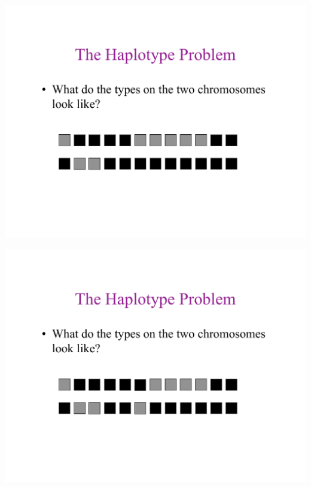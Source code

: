 \newslide{}
\mbox{}
\vspace*{\VertUp}
\enlargethispage*{1000pt}
\begin{center}
\includegraphics*[width=\textwidth]{PPT_pages/pg_0007.pdf}
\end{center}


\newslide{}
\mbox{}
\vspace*{\VertUp}
\enlargethispage*{1000pt}
\begin{center}
\includegraphics*[width=\textwidth]{PPT_pages/pg_0008.pdf}
\end{center}


